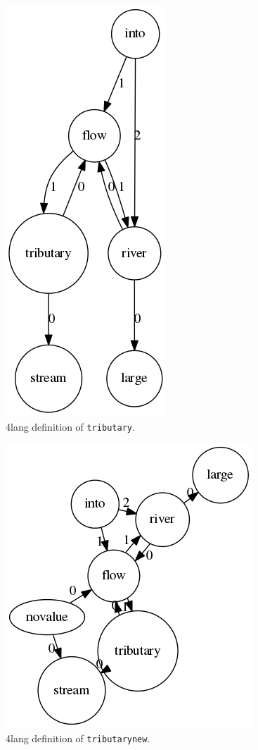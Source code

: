 \documentclass[10pt, a4paper]{article}
\begin{document}
\begin{figure}
\centering
    \includegraphics[scale=0.5]{tributary.png}
\caption{4lang definition of \texttt{tributary}.}
\label{fig:tributary}
\end{figure}

\begin{figure}
\centering
    \includegraphics[scale=0.5]{tributarynew.png}
\caption{4lang definition of \texttt{tributarynew}.}
\label{fig:tributarynew}
\end{figure}
\end{document}
